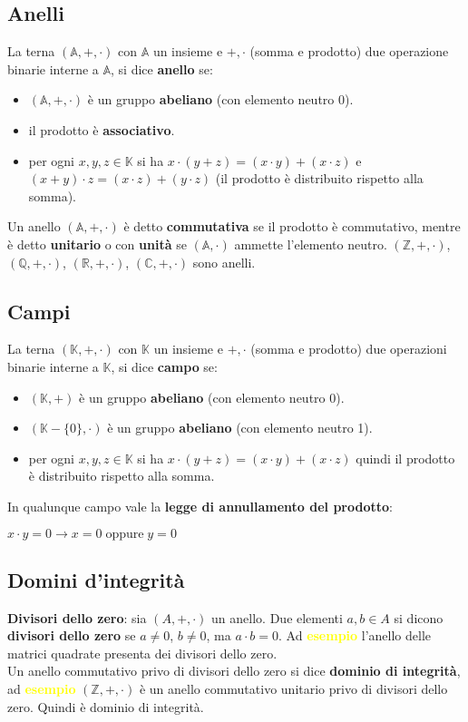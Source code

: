\subsection{Anelli}
La terna $(\mathbb{A}, +, \cdot)$ con $\mathbb{A}$ un insieme e $+, \cdot$ (somma e prodotto) due operazione binarie interne a $\mathbb{A}$, si dice \textbf{anello} se:
\begin{itemize}[nosep]
    \item $(\mathbb{A}, +, \cdot)$ è un gruppo \textbf{abeliano} (con elemento neutro 0).
    \item il prodotto è \textbf{associativo}.
    \item per ogni $x,y,z \in \mathbb{K}$ si ha $x \cdot (y + z) = (x \cdot y) + (x \cdot z)$ e $(x + y) \cdot z = (x \cdot z) + (y \cdot z)$ (il prodotto è distribuito rispetto alla somma).
\end{itemize}
Un anello $(\mathbb{A}, +, \cdot)$ è detto \textbf{commutativa} se il prodotto è commutativo, mentre è detto \textbf{unitario} o con \textbf{unità} se $(\mathbb{A}, \cdot)$ ammette l'elemento neutro. $(\mathbb{Z}, +, \cdot)$, $(\mathbb{Q}, +, \cdot)$, $(\mathbb{R}, +, \cdot)$, $(\mathbb{C}, +, \cdot)$ sono anelli.

\newpage
\subsection{Campi}
La terna $(\mathbb{K}, +, \cdot)$ con $\mathbb{K}$ un insieme e $+, \cdot$ (somma e prodotto) due operazioni binarie interne a $\mathbb{K}$, si dice \textbf{campo} se:
\begin{itemize}[nosep]
    \item $(\mathbb{K}, +)$ è un gruppo \textbf{abeliano} (con elemento neutro 0).
    \item $(\mathbb{K} - \{0\}, \cdot)$ è un gruppo \textbf{abeliano} (con elemento neutro 1).
    \item per ogni $x,y,z \in \mathbb{K}$ si ha $x \cdot (y + z) = (x \cdot y) + (x \cdot z)$ quindi il prodotto è distribuito rispetto alla somma.
\end{itemize}
In qualunque campo vale la \textbf{legge di annullamento del prodotto}:
\begin{center}
    $x \cdot y = 0 \rightarrow x = 0 \; \text{oppure} \; y = 0$
\end{center}

\subsection{Domini d'integrità}
\textbf{Divisori dello zero}: sia $(A, +, \cdot)$ un anello. Due elementi $a,b \in A$ si dicono \textbf{divisori dello zero} se $a \neq 0$, $b \neq 0$, ma $a \cdot b = 0$. Ad \textcolor{yellow}{\textbf{esempio}} l'anello delle matrici quadrate presenta dei divisori dello zero. \\
Un anello commutativo privo di divisori dello zero si dice \textbf{dominio di integrità}, ad \textcolor{yellow}{\textbf{esempio}} $(\mathbb{Z}, +, \cdot)$ è un anello commutativo unitario privo di divisori dello zero. Quindi è dominio di integrità.

